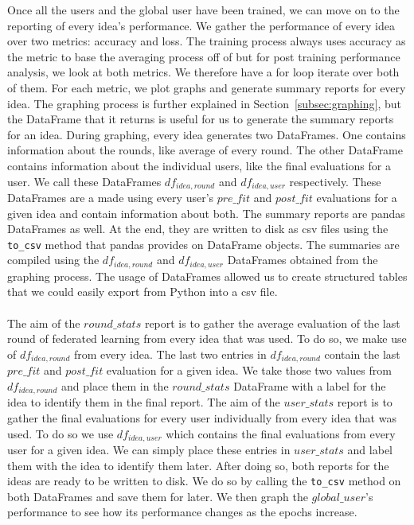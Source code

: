 \documentclass[12pt]{article}
\begin{document}
Once all the users and the global user have been trained, we can move on to the reporting of every idea's performance. We gather the performance of every idea over two metrics: accuracy and loss. The training process always uses accuracy as the metric to base the averaging process off of but for post training performance analysis, we look at both metrics. We therefore have a for loop iterate over both of them. For each metric, we plot graphs and generate summary reports for every idea. The graphing process is further explained in Section~\ref{subsec:graphing}, but the DataFrame that it returns is useful for us to generate the summary reports for an idea. During graphing, every idea generates two DataFrames. One contains information about the rounds, like average of every round. The other DataFrame contains information about the individual users, like the final evaluations for a user. We call these DataFrames $df_{idea, round}$ and $df_{idea, user}$ respectively. These DataFrames are a made using every user's $pre\_fit$ and $post\_fit$ evaluations for a given idea and contain information about both. The summary reports are pandas DataFrames as well. At the end, they are written to disk as csv files using the \texttt{to\_csv} method that pandas provides on DataFrame objects. The summaries are compiled using the $df_{idea, round}$ and $df_{idea, user}$ DataFrames obtained from the graphing process. The usage of DataFrames allowed us to create structured tables that we could easily export from Python into a csv file. 
\\\\
The aim of the $round\_stats$ report is to gather the average evaluation of the last round of federated learning from every idea that was used. To do so, we make use of $df_{idea, round}$ from every idea. The last two entries in $df_{idea, round}$ contain the last $pre\_fit$ and $post\_fit$ evaluation for a given idea. We take those two values from $df_{idea, round}$ and place them in the $round\_stats$ DataFrame with a label for the idea to identify them in the final report. The aim of the $user\_stats$ report is to gather the final evaluations for every user individually from every idea that was used. To do so we use $df_{idea, user}$ which contains the final evaluations from every user for a given idea. We can simply place these entries in $user\_stats$ and label them with the idea to identify them later. After doing so, both reports for the ideas are ready to be written to disk. We do so by calling the \texttt{to\_csv} method on both DataFrames and save them for later. We then graph the $global\_user$'s performance to see how its performance changes as the epochs increase. 
\end{document}
